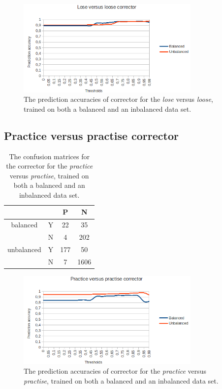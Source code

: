 \documentclass[12pt]{article}
\begin{document}
\begin{figure}[H]
\centering
\includegraphics[width=0.8\textwidth]{accuracy_loseloose.png}
\caption{The prediction accuracies of corrector for the \emph{lose} versus \emph{loose}, trained on both a balanced and an inbalanced data set.}
\end{figure}

\subsection{Practice versus practise corrector}

\begin{table}[H] \footnotesize
\centering
\begin{tabular}{|c|c|c|c|}
\hline
&&P&N\\
\hline
balanced&Y&22&35\\
&N&4&202\\
\hline
\hline
unbalanced&Y&177&50\\
&N&7&1606\\
\hline
\end{tabular}
\caption{The confusion matrices for the corrector for the \emph{practice} versus \emph{practise}, trained on both a balanced and an inbalanced data set.}
\end{table}

\begin{figure}[H]
\centering
\includegraphics[width=0.8\textwidth]{accuracy_practicepractise.png}
\caption{The prediction accuracies of corrector for the \emph{practice} versus \emph{practise}, trained on both a balanced and an inbalanced data set.}
\end{figure}
\end{document}
